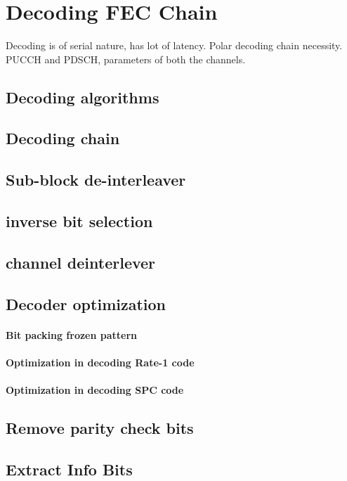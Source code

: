 \chapter{Decoding FEC Chain} \label{chap:decoder}


Decoding is of serial nature, has lot of latency. Polar decoding chain necessity. PUCCH and PDSCH, parameters of both the channels.

\section{Decoding algorithms}


\section{Decoding chain}


\section{Sub-block de-interleaver}


\section{inverse bit selection}


\section{channel deinterlever}

\section{Decoder optimization}

\subsubsection{Bit packing frozen pattern}

\subsubsection{Optimization in decoding Rate-1 code}

\subsubsection{Optimization in decoding SPC code}

\section{Remove parity check bits}

\section{Extract Info Bits}

